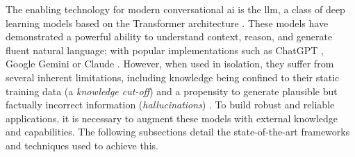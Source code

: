 The enabling technology for modern conversational \ac{ai} is the \acl{llm}, a class of deep learning models based on the Transformer architecture \cite{SOTA-TRANSFORMERS}. These models have demonstrated a powerful ability to understand context, reason, and generate fluent natural language; with popular implementations such as ChatGPT \cite{CHATGPT}, Google Gemini \cite{GEMINI} or Claude \cite{CLAUDE}. However, when used in isolation, they suffer from several inherent limitations, including knowledge being confined to their static training data (a \textit{knowledge cut-off}) and a propensity to generate plausible but factually incorrect information (\textit{hallucinations}) \cite{SOTA-RAG-SURVEY}. To build robust and reliable applications, it is necessary to augment these models with external knowledge and capabilities. The following subsections detail the state-of-the-art frameworks and techniques used to achieve this.